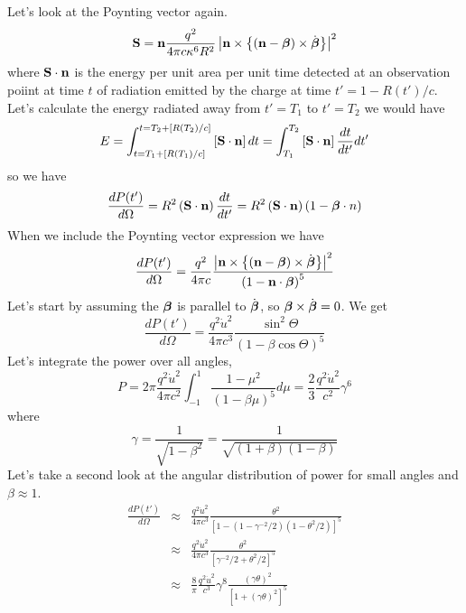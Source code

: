 Let's look at the Poynting vector again.
\begin{equation}
{\bf S} = {\bf n} \frac{q^2}{4\pi c \kappa^6 R^2} \left | {\bf n} \times
\left \{ \left ( {\bf n} - \mbox{\boldmath $\beta$} \right ) \times {\dot{\mbox{\boldmath $\beta$}}}
\right \} \right |^2
\label{eq:211}
\end{equation}
where ${\bf S}\cdot {\bf n}$ is the energy per unit area per unit time
detected at an observation poiint at time $t$ of radiation emitted by
the charge at time $t'=1-R(t')/c$.  Let's calculate the energy radiated away from $t'=T_1$ to $t'=T_2$ we would have
\begin{equation}
E = \int_{t=T_1+[R(T_1)/c]}^{t=T_2+[R(T_2)/c]}\left [{\bf S}\cdot {\bf n} \right ] d t
= \int_{T_1}^{T_2}\left [{\bf S}\cdot {\bf n} \right ] \frac{dt}{dt'} dt'
\label{eq:212}
\end{equation}
so we have
\begin{equation}
\frac{dP(t')}{d\Omega} = R^2 \left ({\bf S}\cdot {\bf n} \right )  \frac{dt}{dt'} = R^2  \left ({\bf S}\cdot {\bf n} \right ) \left ( 1 - \mbox{\boldmath $\beta$} \cdot n\right ) 
\label{eq:213}
\end{equation}
When we include the Poynting vector expression we have
\begin{equation}
\frac{dP(t')}{d\Omega} = \frac{q^2}{4\pi c} \frac{ \left | {\bf n} \times
\left \{ \left ( {\bf n} - \mbox{\boldmath $\beta$} \right ) \times {\dot{\mbox{\boldmath $\beta$}}}
\right \} \right |^2}{\left ( 1 - {\bf n} \cdot \mbox{\boldmath $\beta$} \right )^5}
\label{eq:214}
\end{equation}
Let's start by assuming the $\mbox{\boldmath $\beta$}$ is parallel to ${\dot{\mbox{\boldmath $\beta$}}}$, so  
$\mbox{\boldmath $\beta$} \times {\dot{\mbox{\boldmath $\beta$}}}=0$.  We get
\begin{equation}
\frac{dP(t')}{d\Omega} = \frac{q^2 {\dot u}^2}{4\pi c^3} 
\frac{ \sin^2 \Theta }{\left ( 1 - \beta \cos\Theta  \right )^5}
\label{eq:215}
\end{equation}
Let's integrate the power over all angles,
\begin{equation}
P = 2\pi \frac{q^2 {\dot u}^2}{4\pi c^2} \int_{-1}^1 
\frac{1-\mu^2}{\left ( 1 - \beta \mu \right )^5} d\mu = \frac{2}{3} \frac{q^2 {\dot u}^2}{c^2} \gamma^6
\label{eq:216}
\end{equation}
where
\begin{equation}
\gamma = \frac{1}{\sqrt{1-\beta^2}}=\frac{1}{\sqrt{(1+\beta)(1-\beta)}}
\label{eq:217}
\end{equation}
Let's take a second look at the angular distribution of power for small angles and 
$\beta \approx 1$.
\begin{eqnarray}
\frac{dP(t')}{d\Omega} &\approx&  \frac{q^2 {\dot u}^2}{4\pi c^3} 
\frac{ \theta^2 }{\left [ 1 - (1 - \gamma^{-2}/2 ) (1 - \theta^2/2 )
  \right ]^5} \\
&\approx &
 \frac{q^2 {\dot u}^2}{4\pi c^3} 
\frac{ \theta^2 }{\left [ \gamma^{-2}/2 + \theta^2/2   \right ]^5} \\
&\approx& \frac{8}{\pi}
 \frac{q^2 {\dot u}^2}{c^3} \gamma^8
\frac{ (\gamma \theta)^2 }{\left [ 1 + (\gamma \theta)^2   \right ]^5} 
\label{eq:218}
\end{eqnarray}

